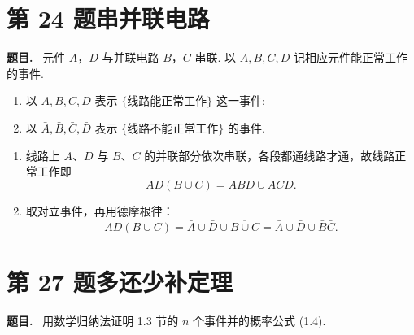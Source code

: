 \documentclass{article}
\newenvironment{problem}{\par\medskip\noindent\textbf{题目.}\ }{\par\smallskip}
\begin{document}
\section*{第 24 题\quad 串并联电路}

\begin{problem}
  元件 $A$，$D$ 与并联电路 $B$，$C$ 串联. 以 $A,B,C,D$ 记相应元件能正常工作的事件.
  \begin{enumerate}[(1)]
    \item 以 $A,B,C,D$ 表示 $\{$线路能正常工作$\}$ 这一事件;
    \item 以 $\bar A,\bar B,\bar C,\bar D$ 表示 $\{$线路不能正常工作$\}$ 的事件.
  \end{enumerate}
\end{problem}

\begin{solution}
  \begin{enumerate}[(1)]
    \item 线路上 $A$、$D$ 与 $B$、$C$ 的并联部分依次串联，各段都通线路才通，故线路正常工作即
      \[
        AD(B\cup C) = ABD\cup ACD .
      \]

    \item 取对立事件，再用德摩根律：
      \[
        \overline{AD(B\cup C)} = \bar A\cup\bar D\cup\overline{B\cup C}
        = \bar A\cup\bar D\cup\bar B\bar C .
      \]
  \end{enumerate}
\end{solution}

\section*{第 27 题\quad 多还少补定理}

\begin{problem}
  用数学归纳法证明 1.3 节的 $n$ 个事件并的概率公式 (1.4).
\end{problem}
\end{document}
